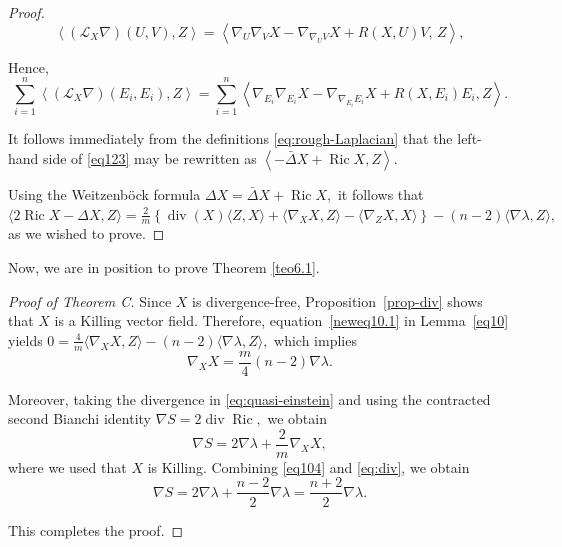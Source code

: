 \documentclass[a4paper, 12pt]{amsart}
\DeclareMathOperator{\Ric}{Ric}
\theoremstyle{definition}
\numberwithin{figure}{section}
\begin{document}
\begin{proof}
\[
\left\langle (\mathcal{L}_X\nabla)(U,V),Z \right\rangle
=
\left\langle
\nabla_U\nabla_VX
-\nabla_{\nabla_UV}X
+R(X,U)V,
\, Z
\right\rangle,
\]


Hence,%
\[
\sum_{i=1}^n
\left\langle
(\mathcal{L}_X\nabla)(E_i,E_i),Z
\right\rangle
=
\sum_{i=1}^n
\left\langle
\nabla_{E_i}\nabla_{E_i}X
-\nabla_{\nabla_{E_i}E_i}X
+R(X,E_i){E_i},
Z
\right\rangle .
\]

It follows immediately from the definitions \eqref{eq:rough-Laplacian} that the left-hand side of \eqref{eq123} may be rewritten as
$
\left\langle
-\bar{\Delta}X+\Ric X,Z
\right\rangle .
$

Using the Weitzenb\"ock formula
\(
\Delta X=\bar{\Delta}X+\Ric X,
\)
it follows that
$
\langle 2\Ric X - \Delta X,Z\rangle
=
\frac{2}{m}\left\{
\operatorname{div}(X)\langle Z,X\rangle
+\langle \nabla_XX,Z\rangle
-\langle \nabla_ZX,X\rangle
\right\}
-(n-2)\langle\nabla\lambda,Z\rangle,
$ as we wished to prove.


\end{proof}

Now, we are in position to prove Theorem \ref{teo6.1}.

\begin{proof}[Proof of Theorem C]

Since \(X\) is divergence-free, Proposition~\ref{prop-div} shows that \(X\) is a Killing vector field. Therefore, equation~\eqref{neweq10.1} in Lemma~\ref{eq10} yields
$ 
0
=
\frac{4}{m}\langle \nabla_XX,Z\rangle
-(n-2)\langle \nabla\lambda,Z\rangle,
$
which implies
\begin{equation}\label{eq104}
\nabla_XX
=
\frac{m}{4}(n-2)\nabla\lambda.
\end{equation}

Moreover, taking the divergence in \eqref{eq:quasi-einstein} and using the contracted second Bianchi identity
$\nabla S = 2\operatorname{div}\operatorname{Ric},
$
we obtain
\begin{equation}\label{eq:div}
\nabla S
=
2\nabla\lambda
+
\frac{2}{m}\nabla_XX,
\end{equation}
where we used that \(X\) is Killing. Combining \eqref{eq104} and \eqref{eq:div}, we obtain
$$
\nabla S
=
2\nabla\lambda
+
\frac{n-2}{2}\nabla\lambda
=
\frac{n+2}{2}\nabla\lambda.
$$

This completes the proof.
\end{proof}
\end{document}
